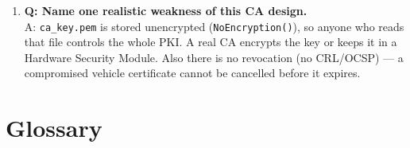 \documentclass[11pt,a4paper]{report}
\begin{document}
\begin{enumerate}
        A: DER is the raw binary encoding; PEM is that binary Base64-encoded as
        text and wrapped in BEGIN/END lines so it survives copy-paste and email.
  \item \textbf{Q: Name one realistic weakness of this CA design.}\\
        A: \texttt{ca\_key.pem} is stored unencrypted (\texttt{NoEncryption()}),
        so anyone who reads that file controls the whole PKI. A real CA encrypts
        the key or keeps it in a Hardware Security Module. Also there is no
        revocation (no CRL/OCSP) --- a compromised vehicle certificate cannot be
        cancelled before it expires.
\end{enumerate}

\section{Glossary}
\end{document}
